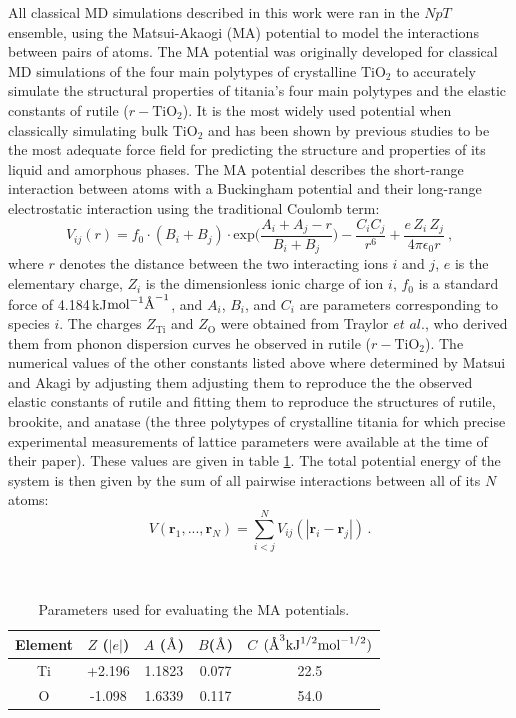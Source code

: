 \documentclass[aps,prb,twocolumn,amsmath,amssymb,superscriptaddress,longbibliography]{revtex4-1}
\newcommand{\angstrom}{\text{\normalfont\AA}}
\newcommand\tab[1][1cm]{\hspace*{#1}} %
\begin{document}
\tab All classical MD simulations described in this work were ran in the $NpT$ ensemble, using the Matsui-Akaogi (MA) potential to model the interactions between pairs of atoms.
The MA potential was originally developed for classical MD simulations of the four main polytypes of crystalline $\text{TiO}_2$\cite{MA_og} to accurately simulate the structural properties of titania's four main polytypes and the elastic constants of rutile ($r-\text{TiO}_2$). 
It is the most widely used potential when classically simulating bulk $\text{TiO}_2$ and has been shown by previous studies\cite{smith_collins,fichtorn,vvh1} to be the most adequate force field for predicting the structure and properties of its liquid and amorphous phases.
The MA potential describes the short-range interaction between atoms with a Buckingham potential and their long-range electrostatic interaction using the traditional Coulomb term:
\begin{equation}
V_{ij}(r) = f_{0}\cdot (B_i+B_j)\cdot\text{exp}\big(\frac{A_i + A_j - r}{B_i + B_j}\big) - \frac{C_{i}C_j}{r^6} + \frac{e\,Z_i\,Z_j}{4\pi\epsilon_0 r}\: ,
\end{equation}
where $r$ denotes the distance between the two interacting ions $i$ and $j$, $e$ is the elementary charge, $Z_i$ is the dimensionless ionic charge of ion $i$, $f_0$ is a standard force of 4.184$\,$kJ$\text{mol}^{-1}\angstrom^{-1}$, and $A_i$, $B_i$, and $C_i$ are parameters corresponding to species $i$.
The charges $Z_{\text{Ti}}$ and $Z_{\text{O}}$ were obtained from Traylor $\textit{et al.}$\cite{traylor}, who derived them from phonon dispersion curves he observed in rutile ($r-\text{TiO}_2$).
The numerical values of the other constants listed above where determined by Matsui and Akagi by adjusting them adjusting them to reproduce the the observed elastic constants of rutile and fitting them to reproduce the structures of rutile, brookite, and anatase (the three polytypes of crystalline titania for which precise experimental measurements of lattice parameters were available at the time of their paper). 
These values are given in table \ref{classpot}.
The total potential energy of the system is then given by the sum of all pairwise interactions between all of its $N$ atoms:
\begin{equation}
V(\textbf{r}_1,...,\textbf{r}_N) = \sum_{i<j}^{N} V_{ij}(|\textbf{r}_i - \textbf{r}_j|)\, .
\end{equation}

\begin{table}[]
\centering
\caption{Parameters used for evaluating the MA potentials.}
\label{classpot}
\
\begin{tabular}{ccccc}
\hline
Element & $Z$ ($|e|$) & $A$ ($\angstrom$) & $B$($\angstrom$) & $C$ $(\angstrom^3\text{kJ}^{1/2}\text{mol}^{-1/2})$ \\ \hline
Ti      & +2.196      & 1.1823            & 0.077            & 22.5                                                \\
O       & -1.098      & 1.6339            & 0.117            & 54.0                                                \\ \hline
\end{tabular}
\end{table}
\end{document}
